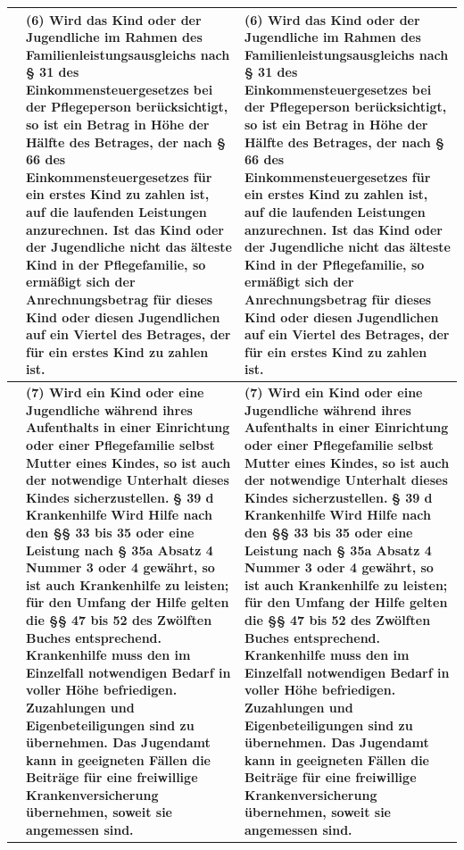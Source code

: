 \documentclass[10pt,a4paper,landscape]{article}
\begin{document}
\begin{longtable}{|L{8.6cm}|L{8.6cm}|L{8.6cm}|}
\hline
 & \textbf{(6) Wird das Kind oder der Jugendliche im Rahmen des Familienleistungsausgleichs nach \S{} 31 des Einkommensteuergesetzes bei der Pflegeperson berücksichtigt, so ist ein Betrag in Höhe der Hälfte des Betrages, der nach \S{} 66 des Einkommensteuergesetzes für ein erstes Kind zu zahlen ist, auf die laufenden Leistungen anzurechnen. Ist das Kind oder der Jugendliche nicht das älteste Kind in der Pflegefamilie, so ermäßigt sich der Anrechnungsbetrag für dieses Kind oder diesen Jugendlichen auf ein Viertel des Betrages, der für ein erstes Kind zu zahlen ist. } & \textbf{(6) Wird das Kind oder der Jugendliche im Rahmen des Familienleistungsausgleichs nach \S{} 31 des Einkommensteuergesetzes bei der Pflegeperson berücksichtigt, so ist ein Betrag in Höhe der Hälfte des Betrages, der nach \S{} 66 des Einkommensteuergesetzes für ein erstes Kind zu zahlen ist, auf die laufenden Leistungen anzurechnen. Ist das Kind oder der Jugendliche nicht das älteste Kind in der Pflegefamilie, so ermäßigt sich der Anrechnungsbetrag für dieses Kind oder diesen Jugendlichen auf ein Viertel des Betrages, der für ein erstes Kind zu zahlen ist. } \\
\hline
 & \textbf{(7) Wird ein Kind oder eine Jugendliche während ihres Aufenthalts in einer Einrichtung oder einer Pflegefamilie selbst Mutter eines Kindes, so ist auch der notwendige Unterhalt dieses Kindes sicherzustellen. }\textbf{\S{} 39 d }\textbf{Krankenhilfe }\textbf{Wird Hilfe nach den \S{}\S{} 33 bis 35 oder eine Leistung nach \S{} 35a Absatz 4 Nummer 3 oder 4 gewährt, so ist auch Krankenhilfe zu leisten; für den Umfang der Hilfe gelten die \S{}\S{} 47 bis 52 des Zwölften Buches entsprechend. Krankenhilfe muss den im Einzelfall notwendigen Bedarf in voller Höhe befriedigen. Zuzahlungen und Eigenbeteiligungen sind zu übernehmen. Das Jugendamt kann in geeigneten Fällen die Beiträge für eine freiwillige Krankenversicherung übernehmen, soweit sie angemessen sind. } & \textbf{(7) Wird ein Kind oder eine Jugendliche während ihres Aufenthalts in einer Einrichtung oder einer Pflegefamilie selbst Mutter eines Kindes, so ist auch }\textbf{der notwendige Unterhalt dieses Kindes sicherzustellen. }\textbf{\S{} 39 d }\textbf{Krankenhilfe }\textbf{Wird Hilfe nach den \S{}\S{} 33 bis 35 oder eine Leistung nach \S{} 35a Absatz 4 Nummer 3 oder 4 gewährt, so ist auch Krankenhilfe zu leisten; für den Umfang der Hilfe gelten die \S{}\S{} 47 bis 52 des Zwölften Buches entsprechend. Krankenhilfe muss den im Einzelfall notwendigen Bedarf in voller Höhe befriedigen. Zuzahlungen und Eigenbeteiligungen sind zu übernehmen. Das Jugendamt kann in geeigneten Fällen die Beiträge für eine freiwillige Krankenversicherung übernehmen, soweit sie angemessen sind. } \\

\end{longtable}
\end{document}
